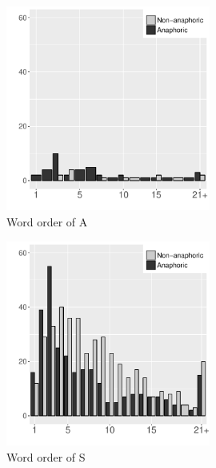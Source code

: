 \begin{figure}
	\begin{center}
	\includegraphics[width=0.6\textwidth]{figure/DEPositionASPA.pdf}
	\caption{Word order of A}
	\label{DEPositionASPAF}
	\end{center}
\end{figure}
\begin{figure}
	\begin{center}
	\includegraphics[width=0.6\textwidth]{figure/DEPositionASPS.pdf}
	\caption{Word order of S}
	\label{DEPositionASPSF}
	\end{center}
\end{figure}
